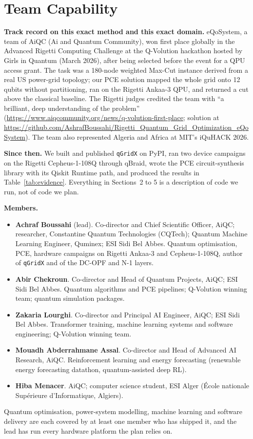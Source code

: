\documentclass[10pt,a4paper]{article}
\newcommand{\blogurl}{https://www.aiqcommunity.org/news/q-volution-first-place}
\newcommand{\qvolrepo}{https://github.com/AshrafBoussahi/Rigetti_Quantum_Grid_Optimization_eQoSystem}
\newcommand{\hibarole}{AiQC; computer science student, ESI Alger (\'Ecole nationale Sup\'erieure d'Informatique, Algiers)}
\begin{document}
\section{Team Capability}

\textbf{Track record on this exact method and this exact domain.} eQoSystem,
a team of AiQC (Ai and Quantum Community), won first place globally in the
Advanced Rigetti Computing Challenge at the Q-Volution hackathon hosted by
Girls in Quantum (March 2026), after being selected before the event for a
QPU access grant. The task was a 180-node weighted Max-Cut instance derived
from a real US power-grid topology; our PCE solution mapped the whole grid onto
12 qubits without partitioning, ran on the Rigetti Ankaa-3 QPU, and returned a
cut above the classical baseline. The Rigetti judges credited the team with
``a brilliant, deep understanding of the problem'' (\url{\blogurl};
solution at \url{\qvolrepo}). The team also represented Algeria and Africa at
MIT's iQuHACK 2026.

\textbf{Since then.} We built and published \texttt{qGridX} on PyPI, ran two
device campaigns on the Rigetti Cepheus-1-108Q through qBraid, wrote the PCE
circuit-synthesis library with its Qiskit Runtime path, and produced the
results in Table~\ref{tab:evidence}. Everything in Sections~2 to 5 is a
description of code we run, not of code we plan.

\textbf{Members.}
\begin{itemize}
\item \textbf{Achraf Boussahi} (lead). Co-director and Chief Scientific
Officer, AiQC; researcher, Constantine Quantum Technologies (CQTech); Quantum
Machine Learning Engineer, Quminex; ESI Sidi Bel Abbes. Quantum optimisation,
PCE, hardware campaigns on Rigetti
Ankaa-3 and Cepheus-1-108Q, author of \texttt{qGridX} and of the DC-OPF and
N-1 layers.
\item \textbf{Abir Chekroun}. Co-director and Head of Quantum Projects, AiQC;
ESI Sidi Bel Abbes. Quantum algorithms and PCE pipelines; Q-Volution winning
team; quantum simulation packages.
\item \textbf{Zakaria Lourghi}. Co-director and Principal AI Engineer, AiQC;
ESI Sidi Bel Abbes. Transformer training, machine learning systems and
software engineering; Q-Volution winning team.
\item \textbf{Mouadh Abderrahmane Assal}. Co-director and Head of Advanced AI
Research, AiQC. Reinforcement learning and energy forecasting (renewable
energy forecasting datathon, quantum-assisted deep RL).
\item \textbf{Hiba Menacer}. \hibarole.
\end{itemize}
Quantum optimisation, power-system modelling, machine learning and software
delivery are each covered by at least one member who has shipped it, and the
lead has run every hardware platform the plan relies on.
\end{document}
